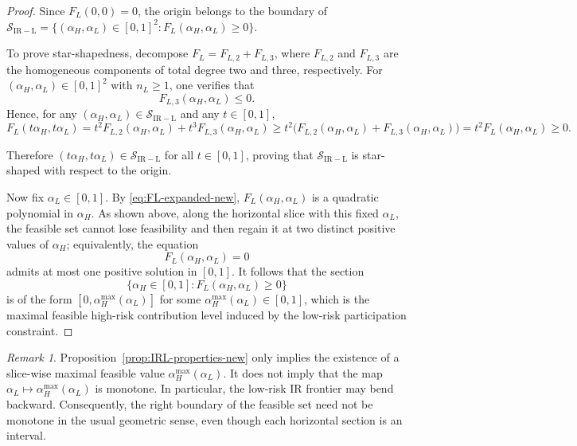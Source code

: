 \documentclass[a4paper,12pt]{article}
\theoremstyle{definition}
\theoremstyle{remark}
\newtheorem{remark}[theorem]{Remark}
\newcommand{\1}{\mathbf{1}}
\begin{document}
\begin{proof}
Since \(F_L(0,0)=0\), the origin belongs to the boundary of
\(\mathcal S_{\mathrm{IR-L}}=\{(\alpha_H,\alpha_L)\in[0,1]^2:F_L(\alpha_H,\alpha_L)\ge 0\}\).

To prove star-shapedness, decompose \(F_L=F_{L,2}+F_{L,3}\), where
\(F_{L,2}\) and \(F_{L,3}\) are the homogeneous components of total degree two
and three, respectively. For \((\alpha_H,\alpha_L)\in[0,1]^2\) with \(n_L\ge 1\),
one verifies that
\[
F_{L,3}(\alpha_H,\alpha_L)\le 0.
\]
Hence, for any \((\alpha_H,\alpha_L)\in \mathcal S_{\mathrm{IR-L}}\) and any
\(t\in[0,1]\),
\[
F_L(t\alpha_H,t\alpha_L)
= t^2 F_{L,2}(\alpha_H,\alpha_L)+t^3 F_{L,3}(\alpha_H,\alpha_L)
\ge t^2\bigl(F_{L,2}(\alpha_H,\alpha_L)+F_{L,3}(\alpha_H,\alpha_L)\bigr)
= t^2 F_L(\alpha_H,\alpha_L)\ge 0.
\]

Therefore \((t\alpha_H,t\alpha_L)\in\mathcal S_{\mathrm{IR-L}}\) for all
\(t\in[0,1]\), proving that \(\mathcal S_{\mathrm{IR-L}}\) is star-shaped with
respect to the origin.

Now fix \(\alpha_L\in[0,1]\). By \eqref{eq:FL-expanded-new},
\(F_L(\alpha_H,\alpha_L)\) is a quadratic polynomial in \(\alpha_H\). As shown
above, along the horizontal slice with this fixed \(\alpha_L\), the feasible set
cannot lose feasibility and then regain it at two distinct positive values of
\(\alpha_H\); equivalently, the equation
\[
F_L(\alpha_H,\alpha_L)=0
\]
admits at most one positive solution in \([0,1]\). It follows that the section
\[
\{\alpha_H\in[0,1]: F_L(\alpha_H,\alpha_L)\ge 0\}
\]
is of the form \([0,\alpha_H^{\max}(\alpha_L)]\) for some
\(\alpha_H^{\max}(\alpha_L)\in[0,1]\), which is the maximal feasible
high-risk contribution level induced by the low-risk participation constraint.
\end{proof}

\begin{remark}\label{rem:backward-bending}
Proposition~\ref{prop:IRL-properties-new} only implies the existence of a
slice-wise maximal feasible value \(\alpha_H^{\max}(\alpha_L)\). It does not
imply that the map \(\alpha_L\mapsto \alpha_H^{\max}(\alpha_L)\) is monotone.
In particular, the low-risk IR frontier may bend backward. Consequently, the
right boundary of the feasible set need not be monotone in the usual geometric
sense, even though each horizontal section is an interval.
\end{remark}
\end{document}
